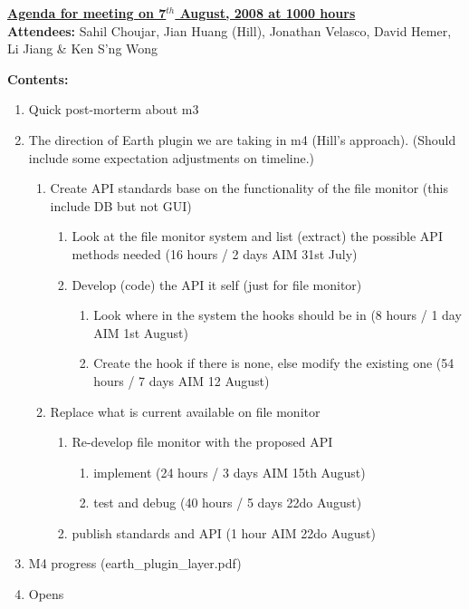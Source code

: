 \documentclass{letter}
\begin{document}
{\large \textbf{\underline{Agenda for meeting on 7$^{th}$ August, 2008 at 1000 hours}}}\\

\textbf{Attendees:} Sahil Choujar, Jian Huang (Hill), Jonathan Velasco, David Hemer, Li Jiang \& Ken S'ng Wong

\textbf{Contents:}

\begin{enumerate}
	\item Quick post-morterm about m3 
	\item The direction of Earth plugin we are taking in m4 (Hill's approach). (Should include  some expectation adjustments on timeline.)
		\begin{enumerate}
			\item Create API standards base on the functionality of the file monitor (this include DB but not GUI)
				\begin{enumerate}
					\item Look at the file monitor system and list (extract) the possible API methods needed (16 hours / 2 days AIM 31st July)
					\item Develop (code) the API it self (just for file monitor)
						\begin{enumerate}
							\item Look where in the system the hooks should be in (8 hours / 1 day AIM 1st August)
							\item Create the hook if there is none, else modify the existing one (54 hours / 7 days AIM 12 August)
						\end{enumerate}
				\end{enumerate}
			\item Replace what is current available on file monitor
				\begin{enumerate}
					\item Re-develop file monitor with the proposed API %
					\begin{enumerate}
						\item implement (24 hours / 3 days AIM 15th August)
						\item test and debug (40 hours / 5 days 22do August)
					\end{enumerate}
					\item publish standards and API (1 hour AIM 22do August) %
				\end{enumerate}
		\end{enumerate}
	\item M4 progress (earth\_plugin\_layer.pdf)
	\item Opens
\end{enumerate}
\end{document}
